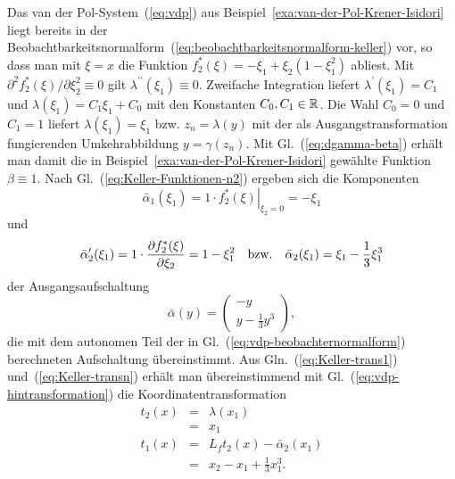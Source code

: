 \begin{example}
\label{exa:van-der-Pol-Keller}Das van der Pol-System~(\ref{eq:vdp})
aus Beispiel~\ref{exa:van-der-Pol-Krener-Isidori} liegt bereits
in der Beobachtbarkeitsnormalform~(\ref{eq:beobachtbarkeitsnormalform-keller})
vor, so dass man mit $\xi=x$ die Funktion $f_{2}^{*}(\xi)=-\xi_{1}+\xi_{2}(1-\xi_{1}^{2})$
abliest. Mit $\partial^{2}f_{2}^{*}(\xi)/\partial\xi_{2}^{2}\equiv0$
gilt $\lambda^{\prime\prime}(\xi_{1})\equiv0$. Zweifache Integration
liefert $\lambda^{\prime}(\xi_{1})=C_{1}$ und $\lambda(\xi_{1})=C_{1}\xi_{1}+C_{0}$
mit den Konstanten $C_{0},C_{1}\in{\mathbb{R}}$. Die Wahl $C_{0}=0$ und $C_{1}=1$
liefert $\lambda(\xi_{1})=\xi_{1}$ bzw. $z_{n}=\lambda(y)$ mit der
als Ausgangstransformation fungierenden Umkehrabbildung $y=\gamma(z_{n})$.
Mit Gl.~(\ref{eq:dgamma-beta}) erhält man damit die in Beispiel~\ref{exa:van-der-Pol-Krener-Isidori}
gewählte Funktion $\beta\equiv1$. Nach Gl.~(\ref{eq:Keller-Funktionen-n2})
ergeben sich die Komponenten 
\[
\bar{\alpha}_{1}(\xi_{1})=1\cdot\left.f_{2}^{*}(\xi)\right|_{\xi_{2}=0}=-\xi_{1}
\]
und 
\[
\bar{\alpha}_{2}^{\prime}(\xi_{1})=1\cdot\frac{\partial f_{2}^{*}(\xi)}{\partial\xi_{2}}=1-\xi_{1}^{2}\quad\text{\text{bzw.}}\quad\bar{\alpha}_{2}(\xi_{1})=\xi_{1}-\frac{1}{3}\xi_{1}^{3}
\]
der Ausgangsaufschaltung
\[
\bar{\alpha}(y)=\left(\begin{array}{c}
-y\\
y-\frac{1}{3}y^{3}
\end{array}\right),
\]
die mit dem autonomen Teil der in Gl.~(\ref{eq:vdp-beobachternormalform})
berechneten Aufschaltung übereinstimmt. Aus Gln.~(\ref{eq:Keller-trans1})
und~(\ref{eq:Keller-transn}) erhält man übereinstimmend mit Gl.~(\ref{eq:vdp-hintransformation})
die Koordinatentransformation
\[
\begin{array}{lcl}
t_{2}(x) & = & \lambda(x_{1})\\
 & = & x_{1}\\
t_{1}(x) & = & L_{f}t_{2}(x)-\bar{\alpha}_{2}(x_{1})\\
 & = & x_{2}-x_{1}+\frac{1}{3}x_{1}^{3}.
\end{array}
\]
\end{example}

